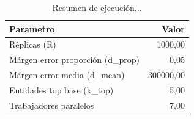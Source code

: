 \begin{table}

\caption{\label{tab:table-exec}Resumen de ejecución...}
\centering
\begin{tabular}[t]{lr}
\toprule
Parametro & Valor\\
\midrule
Réplicas (R) & 1000,00\\
Márgen error proporción (d\_prop) & 0,05\\
Márgen error media (d\_mean) & 300000,00\\
Entidades top base (k\_top) & 5,00\\
Trabajadores paralelos & 7,00\\
\bottomrule
\end{tabular}
\end{table}
